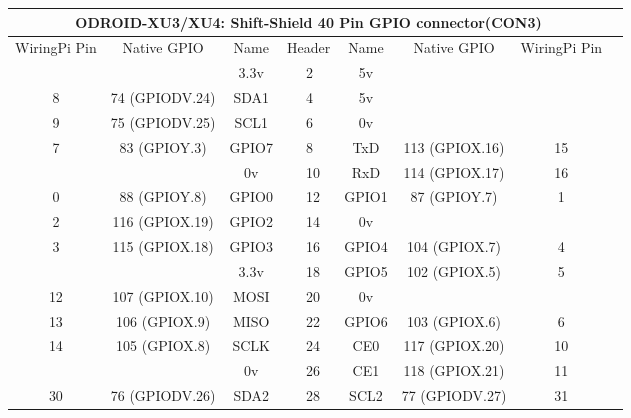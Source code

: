 \documentclass[12pt,a4paper]{article}
\begin{document}
\begin{sffamily}
\begin{center}
\begin{tabular}{|c|c|c||p{8mm}|p{8mm}||c|c|c|c|}
\hline
\multicolumn{8}{|c|}{\bfseries{ODROID-XU3/XU4: Shift-Shield 40 Pin GPIO connector(CON3)}}\\
\hline
\hline
WiringPi Pin	& Native GPIO	& Name	& \multicolumn{2}{|c||}{Header}	& Name	& Native GPIO	& WiringPi Pin\\
\hline
\hline
	& 		& \textcolor{rtb-red}{3.3v}	& \raggedleft{1} &  2 & \textcolor{rtb-maroon}{5v}	& 		& \\
\hline
8	& 74 (GPIODV.24)& \textcolor{rtb-aqua}{SDA1}	& \raggedleft{3} &  4 & \textcolor{rtb-maroon}{5v}	& 		& \\
\hline
9	& 75 (GPIODV.25)& \textcolor{rtb-aqua}{SCL1}	& \raggedleft{5} &  6 & \textcolor{rtb-black}{0v}	& 		& \\
\hline
7	& 83 (GPIOY.3)	& \textcolor{rtb-green}{GPIO7}	& \raggedleft{7} &  8 & \textcolor{rtb-yellow}{TxD}	& 113 (GPIOX.16)& 15\\
\hline
	& 		& \textcolor{rtb-black}{0v}	& \raggedleft{9} & 10 & \textcolor{rtb-yellow}{RxD}	& 114 (GPIOX.17)& 16\\
\hline
0	& 88 (GPIOY.8)	& \textcolor{rtb-green}{GPIO0}	& \raggedleft{11} & 12 & \textcolor{rtb-green}{GPIO1}	& 87 (GPIOY.7)	& 1\\
\hline
2	& 116 (GPIOX.19)& \textcolor{rtb-green}{GPIO2}	& \raggedleft{13} & 14 & \textcolor{rtb-black}{0v}	& 		& \\
\hline
3	& 115 (GPIOX.18)& \textcolor{rtb-green}{GPIO3}	& \raggedleft{15} & 16 & \textcolor{rtb-green}{GPIO4}	& 104 (GPIOX.7)	& 4\\
\hline
	& 		& \textcolor{rtb-red}{3.3v}	& \raggedleft{17} & 18 & \textcolor{rtb-green}{GPIO5}	& 102 (GPIOX.5)	& 5\\
\hline
12	& 107 (GPIOX.10)& \textcolor{rtb-teal}{MOSI}	& \raggedleft{19} & 20 & \textcolor{rtb-black}{0v}	& 		& \\
\hline
13	& 106 (GPIOX.9)	& \textcolor{rtb-teal}{MISO}	& \raggedleft{21} & 22 & \textcolor{rtb-green}{GPIO6}	& 103 (GPIOX.6)	& 6\\
\hline
14	& 105 (GPIOX.8)	& \textcolor{rtb-teal}{SCLK}	& \raggedleft{23} & 24 & \textcolor{rtb-teal}{CE0}	& 117 (GPIOX.20)& 10\\
\hline
	& 		& \textcolor{rtb-black}{0v}	& \raggedleft{25} & 26 & \textcolor{rtb-teal}{CE1}	& 118 (GPIOX.21)& 11\\
\hline
30	& 76 (GPIODV.26)& \textcolor{rtb-green}{SDA2}	& \raggedleft{27} & 28 & \textcolor{rtb-green}{SCL2}	& 77 (GPIODV.27)& 31\\

\end{tabular}
\end{center}
\end{sffamily}
\end{document}
